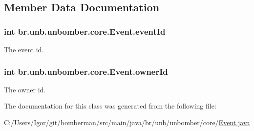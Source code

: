 \subsection{Member Data Documentation}
\hypertarget{classbr_1_1unb_1_1unbomber_1_1core_1_1_event_a3df54ae61fbfbe2ec356abe70b0bcf55}{
\subsubsection[{event\+Id}]{\setlength{\rightskip}{0pt plus 5cm}int br.\+unb.\+unbomber.\+core.\+Event.\+event\+Id\hspace{0.3cm}{\ttfamily [private]}}}\label{classbr_1_1unb_1_1unbomber_1_1core_1_1_event_a3df54ae61fbfbe2ec356abe70b0bcf55}


The event id. 

\hypertarget{classbr_1_1unb_1_1unbomber_1_1core_1_1_event_afd44621bcd3e242d33eaad558310bedd}{
\subsubsection[{owner\+Id}]{\setlength{\rightskip}{0pt plus 5cm}int br.\+unb.\+unbomber.\+core.\+Event.\+owner\+Id\hspace{0.3cm}{\ttfamily [private]}}}\label{classbr_1_1unb_1_1unbomber_1_1core_1_1_event_afd44621bcd3e242d33eaad558310bedd}


The owner id. 



The documentation for this class was generated from the following file\+:\begin{DoxyCompactItemize}
\item 
C\+:/\+Users/\+Igor/git/bomberman/src/main/java/br/unb/unbomber/core/\hyperlink{_event_8java}{Event.\+java}\end{DoxyCompactItemize}
